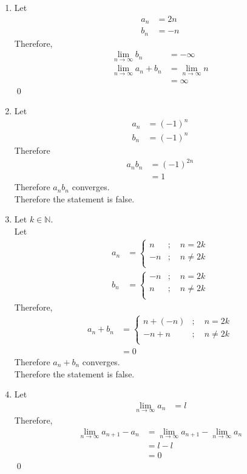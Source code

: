\documentclass[fleqn, a4paper, 12pt, oneside]{amsart}
\theoremstyle{definition}
\theoremstyle{theorem}
\begin{document}
\begin{solution}
	\begin{enumerate}[leftmargin=*]
		\item 
			Let
			\begin{align*}
				a_n &= 2 n\\
				b_n &= -n
			\end{align*}
			Therefore,
			\begin{align*}
				\lim\limits_{n \to \infty} b_n &= -\infty\\
				\lim\limits_{n \to \infty} a_n + b_n &= \lim\limits_{n \to \infty} n\\
				&= \infty
			\end{align*}
			\qed
		\item
			Let
			\begin{align*}
				a_n &= (-1)^n\\
				b_n &= (-1)^n
			\end{align*}
			Therefore
			\begin{align*}
				a_n b_n &= (-1)^{2 n}\\
				&= 1
			\end{align*}
			Therefore $a_n b_n$ converges.\\
			Therefore the statement is false.
		\item
			Let $k \in \mathbb{N}$.\\
			Let
			\begin{align*}
				a_n &= 
					\begin{cases}
						n &;\quad n = 2 k\\
						-n &;\quad n \neq 2 k\\
					\end{cases}\\
				b_n &= 
					\begin{cases}
						-n &;\quad n = 2 k\\
						n &;\quad n \neq 2 k\\
					\end{cases}
			\end{align*}
			Therefore,
			\begin{align*}
				a_n + b_n &= 
					\begin{cases}
						n + (-n) &;\quad n = 2 k\\
						-n + n &;\quad n \neq 2 k\\
					\end{cases}\\
				&= 0
			\end{align*}
			Therefore $a_n + b_n$ converges.\\
			Therefore the statement is false.
		\item
			Let
			\begin{align*}
				\lim\limits_{n \to \infty} a_n &= l
			\end{align*}
			Therefore,
			\begin{align*}
				\lim\limits_{n \to \infty} a_{n + 1} - a_n &= \lim\limits_{n \to \infty} a_{n + 1} - \lim\limits_{n \to \infty} a_n\\
				&= l - l\\
				&= 0
			\end{align*}
			\qed
	\end{enumerate}
\end{solution}
\end{document}
